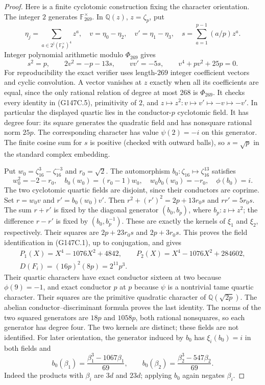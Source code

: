 \begin{proof}
Here is a finite cyclotomic construction fixing the character orientation.
The integer $2$ generates $\mathbb F_{269}^{\times}$.
In $\mathbb Q(z)$, $z=\zeta_p$, put
\[
 \eta_j=\sum_{a\in2^j(\mathbb F_p^\times)^4}z^a,\quad
 v=\eta_0-\eta_2,\quad v'=\eta_1-\eta_3,\quad
 s=\sum_{a=1}^{p-1}(a/p)z^a.
 \tag{G147C.4}
\]
Integer polynomial arithmetic modulo $\Phi_{269}$ gives
\[
 s^2=p,\qquad 2v^2=-p-13s,\qquad vv'=-5s,
 \qquad v^4+pv^2+25p=0.
 \tag{G147C.5}
\]
For reproducibility the exact verifier uses length-$269$ integer
coefficient vectors and cyclic convolution.  A vector vanishes at
$z$ exactly when all its coefficients are equal, since the only
rational relation of degree at most $268$ is $\Phi_{269}$.
It checks every identity in (G147C.5), primitivity of $2$, and
$z\mapsto z^2:v\mapsto v'\mapsto-v\mapsto-v'$.
In particular the displayed quartic lies in the conductor-$p$
cyclotomic field.  It has degree four: its square generates the
quadratic field and has nonsquare rational norm $25p$.
The corresponding character has value $\psi(2)=-i$ on this generator.
The finite cosine sum for $s$ is positive (checked with outward balls),
so $s=\sqrt p$ in the standard complex embedding.

Put $w_0=\zeta_{16}^{3}-\zeta_{16}^{-3}$ and $r_0=\sqrt2$.
The automorphism $b_0:\zeta_{16}\mapsto\zeta_{16}^{13}$ satisfies
\[
 w_0^2=-2-r_0,\quad b_0(w_0)=(r_0-1)w_0,\quad
 w_0b_0(w_0)=-r_0,\quad \phi(b_0)=i.
 \tag{G147C.6}
\]
The two cyclotomic quartic fields are disjoint, since their
conductors are coprime.  Set $r=w_0v$ and $r'=b_0(w_0)v'$.
Then $r^2+(r')^2=2p+13r_0s$ and $rr'=5r_0s$.
The sum $r+r'$ is fixed by the diagonal generator $(b_0,b_p)$,
where $b_p:z\mapsto z^2$; the difference $r-r'$ is fixed by
$(b_0,b_p^{-1})$.  These are exactly the kernels of $\xi_1$ and
$\xi_2$, respectively.  Their squares are $2p+23r_0s$ and
$2p+3r_0s$.  This proves the field identification in (G147C.1),
up to conjugation, and gives
\[
 \begin{gathered}
 P_1(X)=X^4-1076X^2+4842,\qquad
 P_2(X)=X^4-1076X^2+284602,\\
 D(F_i)=(16p)^2(8p)=2^{11}p^3.
 \end{gathered}
 \tag{G147C.7}
\]
Their quartic characters have exact conductor sixteen at two
because $\phi(9)=-1$, and exact conductor $p$ at $p$ because
$\psi$ is a nontrivial tame quartic character.  Their squares
are the primitive quadratic character of $\mathbb Q(\sqrt{2p})$.
The abelian conductor--discriminant formula proves the last identity.
The norms of the two squared generators are $18p$ and $1058p$,
both rational nonsquares, so each generator has degree four.
The two kernels are distinct; these fields are not identified.
For later orientation, the generator induced by $b_0$ has
$\xi_i(b_0)=i$ in both fields and
\[
 b_0(\beta_1)=\frac{\beta_1^3-1067\beta_1}{69},\qquad
 b_0(\beta_2)=\frac{\beta_2^3-547\beta_2}{69}.
 \tag{G147C.8}
\]
Indeed the products with $\beta_i$ are $3d$ and $23d$; applying
$b_0$ again negates $\beta_i$.


\end{proof}
